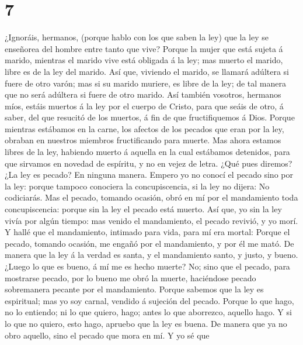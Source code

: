 \hypertarget{section-6}{%
\section{7}\label{section-6}}

 ¿Ignoráis, hermanos, (porque hablo con los que saben la
ley) que la ley se enseñorea del hombre entre tanto que vive?
 Porque la mujer que está sujeta á marido, mientras el
marido vive está obligada á la ley; mas muerto el marido, libre es de la
ley del marido.  Así que, viviendo el marido, se llamará
adúltera si fuere de otro varón; mas si su marido muriere, es libre de
la ley; de tal manera que no será adúltera si fuere de otro marido.
 Así también vosotros, hermanos míos, estáis muertos á la
ley por el cuerpo de Cristo, para que seáis de otro, á saber, del que
resucitó de los muertos, á fin de que fructifiquemos á Dios.
 Porque mientras estábamos en la carne, los afectos de los
pecados que eran por la ley, obraban en nuestros miembros fructificando
para muerte.  Mas ahora estamos libres de la ley, habiendo
muerto á aquella en la cual estábamos detenidos, para que sirvamos en
novedad de espíritu, y no en vejez de letra.  ¿Qué pues
diremos? ¿La ley es pecado? En ninguna manera. Empero yo no conocí el
pecado sino por la ley: porque tampoco conociera la concupiscencia, si
la ley no dijera: No codiciarás.  Mas el pecado, tomando
ocasión, obró en mí por el mandamiento toda concupiscencia: porque sin
la ley el pecado está muerto.  Así que, yo sin la ley
vivía por algún tiempo: mas venido el mandamiento, el pecado revivió, y
yo morí.  Y hallé que el mandamiento, intimado para vida,
para mí era mortal:  Porque el pecado, tomando ocasión,
me engañó por el mandamiento, y por él me mató.  De
manera que la ley á la verdad es santa, y el mandamiento santo, y justo,
y bueno.  ¿Luego lo que es bueno, á mí me es hecho
muerte? No; sino que el pecado, para mostrarse pecado, por lo bueno me
obró la muerte, haciéndose pecado sobremanera pecante por el
mandamiento.  Porque sabemos que la ley es espiritual;
mas yo soy carnal, vendido á sujeción del pecado.  Porque
lo que hago, no lo entiendo; ni lo que quiero, hago; antes lo que
aborrezco, aquello hago.  Y si lo que no quiero, esto
hago, apruebo que la ley es buena.  De manera que ya no
obro aquello, sino el pecado que mora en mí.  Y yo sé que
